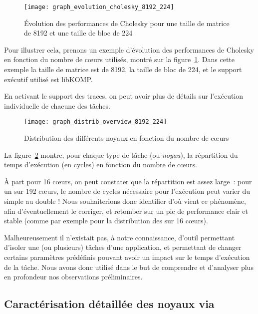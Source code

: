 \begin{figure}[t!]
  \centering
  \texttt{[image: graph\_evolution\_cholesky\_8192\_224]}
  \caption{Évolution des performances de Cholesky pour une taille de matrice de 8192 et une taille de bloc de 224}\label{fig:contribs:apps:cholesky:overview-8192-224}
\end{figure}

Pour illustrer cela, prenons un exemple d'évolution des performances de Cholesky en fonction du nombre de cœurs utilisés, montré sur la figure~\ref{fig:contribs:apps:cholesky:overview-8192-224}. Dans cette exemple la taille de matrice est de 8192, la taille de bloc de 224, et le support exécutif utilisé est libKOMP.

En activant le support des traces, on peut avoir plus de détails sur l'exécution individuelle de chacune des tâches.

\begin{figure}[h!]
  \centering
  \texttt{[image: graph\_distrib\_overview\_8192\_224]}
  \caption{Distribution des différents noyaux en fonction du nombre de cœurs}\label{fig:contribs:apps:cholesky:distrib-overview-8192-224}
\end{figure}

La figure~\ref{fig:contribs:apps:cholesky:distrib-overview-8192-224} montre, pour chaque type de tâche (ou \emph{noyau}), la répartition du temps d'exécution (en cycles) en fonction du nombre de cœurs.

À part pour 16 cœurs, on peut constater que la répartition est assez large~: pour un \gemm sur 192 cœurs, le nombre de cycles nécessaire pour l'exécution peut varier du simple au double !
Nous souhaiterions donc identifier d'où vient ce phénomène, afin d'éventuellement le corriger, et retomber sur un pic de performance clair et stable (comme par exemple pour la distribution des \potrf sur 16 cœurs).

Malheureusement il n'existait pas, à notre connaissance, d'outil permettant d'isoler une (ou plusieurs) tâches d'une application, et permettant de changer certains paramètres prédéfinis pouvant avoir un impact sur le temps d'exécution de la tâche.
Nous avons donc utilisé \outil dans le but de comprendre et d'analyser plus en profondeur nos observations préliminaires.

\subsection{Caractérisation détaillée des noyaux via \outil}\label{sec:contribs:apps:cholesky:carton}

